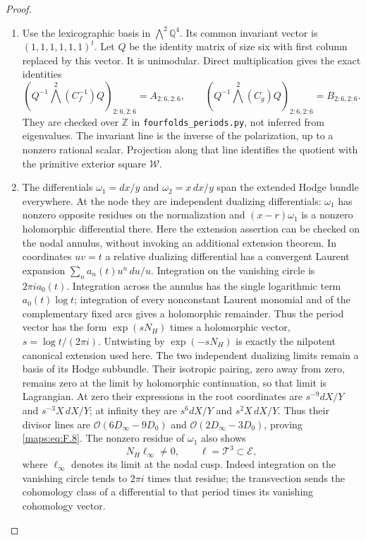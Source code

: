 \documentclass[11pt,a4paper]{article}
\theoremstyle{definition}
\begin{document}
\begin{proof}
\begin{enumerate}[label=\arabic*.]
\item Use the lexicographic basis in $\bigwedge^2\mathbb Q^4$.
Its common invariant vector is $(1,1,1,1,1,1)^t$.
Let $Q$ be the identity matrix of size six with first column
replaced by this vector.  It is unimodular.  Direct multiplication
gives the exact identities
\[
 \left(Q^{-1}\bigwedge^2(C_f^{-1})Q\right)_{2:6,2:6}
   =A_{2:6,2:6},\qquad
 \left(Q^{-1}\bigwedge^2(C_g)Q\right)_{2:6,2:6}
   =B_{2:6,2:6}.
 \tag{F.11}\label{maps:eq:F.11}
\]
They are checked over $\mathbb Z$ in
\texttt{fourfolds\_periods.py}, not inferred from eigenvalues.
The invariant line is the inverse of the polarization, up to a
nonzero rational scalar.  Projection along that line identifies
the quotient with the primitive exterior square $\mathcal W$.

\item The differentials $\omega_1=dx/y$ and $\omega_2=x\,dx/y$ span
the extended Hodge bundle everywhere.  At the node they are
independent dualizing differentials: $\omega_1$ has nonzero
opposite residues on the normalization and
$(x-r)\omega_1$ is a nonzero holomorphic differential there.
Here the extension assertion can be checked on the nodal
annulus, without invoking an additional extension theorem.
In coordinates $uv=t$ a relative dualizing differential has
a convergent Laurent expansion
$\sum_n a_n(t)u^n\,du/u$.  Integration on the vanishing circle
is $2\pi i a_0(t)$.  Integration across the annulus has the
single logarithmic term $a_0(t)\log t$; integration of every
nonconstant Laurent monomial and of the complementary fixed
arcs gives a holomorphic remainder.  Thus the period vector
has the form $\exp(sN_H)$ times a holomorphic vector,
$s=\log t/(2\pi i)$.  Untwisting by $\exp(-sN_H)$ is exactly
the nilpotent canonical extension used here.  The two independent
dualizing limits remain a basis of its Hodge subbundle.
Their isotropic pairing, zero away from zero, remains zero
at the limit by holomorphic continuation, so that limit is
Lagrangian.
At zero their expressions in the root coordinates are
$s^{-9}dX/Y$ and $s^{-3}X\,dX/Y$; at infinity they are
$s^6dX/Y$ and $s^2X\,dX/Y$.
Thus their divisor lines are
$\mathcal O(6D_\infty-9D_0)$ and
$\mathcal O(2D_\infty-3D_0)$, proving \eqref{maps:eq:F.8}.
The nonzero residue of $\omega_1$ also shows
\[
 N_H\ell_\infty\ne0,
 \qquad \ell=\mathcal T^3\subset\mathcal E,
 \tag{F.12}\label{maps:eq:F.12}
\]
where $\ell_\infty$ denotes its limit at the nodal cusp.
Indeed integration on the vanishing circle tends to
$2\pi i$ times that residue; the transvection sends the cohomology
class of a differential to that period times its vanishing
cohomology vector.

\end{enumerate}
\end{proof}
\end{document}
